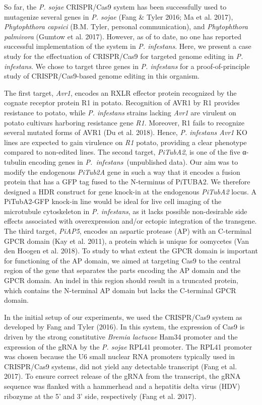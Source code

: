 \documentclass[onecolumn, 11pt,openany]{memoir}
\begin{document}
\begin{multicols}{2}
So far, the \textit{P. sojae} CRISPR/Cas9 system has been successfully used to mutagenize several genes in \textit{P. sojae} (Fang \& Tyler 2016; Ma et al. 2017), \textit{Phytophthora capsici }(B.M. Tyler, personal communication), and \textit{Phytophthora palmivora} (Gumtow et al. 2017). However, as of to date, no one has reported successful implementation of the system in \textit{P. infestans}. Here, we present a case study for the effectuation of CRISPR/Cas9 for targeted genome editing in \textit{P. infestans}. We chose to target three genes in \textit{P. infestans} for a proof-of-principle study of CRISPR/Cas9-based genome editing in this organism. 

The first target, \textit{Avr1}, encodes an RXLR effector protein recognized by the cognate receptor protein R1 in potato. Recognition of AVR1 by R1 provides resistance to potato, while\textit{ P. infestans} strains lacking \textit{Avr1 }are virulent on potato cultivars harboring resistance gene \textit{R1}. Moreover, R1 fails to recognize several mutated forms of AVR1 (Du et al. 2018). Hence, \textit{P. infestans Avr1} KO lines are expected to gain virulence on \textit{R1} potato, providing a clear phenotype compared to non-edited lines. The second target, \textit{PiTubA2}, is one of the five α-tubulin encoding genes in \mbox{\textit{P. infestans }}(unpublished data). Our aim was to modify the endogenous \textit{PiTub2A }gene\textit{ }in such a way that it encodes a fusion protein that has a GFP tag fused to the N-terminus of PiTUBA2. We therefore designed a HDR construct for gene knock-in at the endogenous \textit{PiTubA2 }locus. A PiTubA2-GFP knock-in line would be ideal for live cell imaging of the microtubule cytoskeleton in \textit{P. infestans}, as it lacks possible non-desirable side effects associated with overexpression and/or ectopic integration of the transgene. The third target, \textit{PiAP5}, encodes an aspartic protease (AP) with an C-terminal GPCR domain (Kay et al. 2011), a protein which is unique for oomycetes (Van den Hoogen et al. 2018). To study to what extent the GPCR domain is important for functioning of the AP domain, we aimed at targeting Cas9 to the central region of the gene that separates the parts encoding the AP domain and the GPCR domain. An indel in this region should result in a truncated protein, which contains the N-terminal AP domain but lacks the C-terminal GPCR domain.

In the initial setup of our experiments, we used the CRISPR/Cas9 system as developed by Fang and Tyler (2016). In this system, the expression of Cas9 is driven by the strong constitutive \textit{Bremia lactucae }Ham34 promoter and the expression of the gRNA\textit{ }by the \textit{P. sojae} RPL41 promoter. The RPL41 promoter was chosen because the U6 small nuclear RNA promoters typically used in CRISPR/Cas9 systems, did not yield any detectable transcript (Fang et al. 2017). To ensure correct release of the gRNA from the transcript, the gRNA sequence was flanked with a hammerhead and a hepatitis delta virus (HDV) ribozyme at the 5' and 3' side, respectively (Fang et al. 2017).


\end{multicols}
\end{document}
